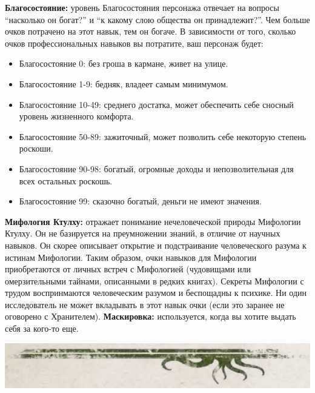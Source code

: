 \documentclass[letterpaper,twocolumn,openany, twoside, 11pt, usenames]{cocbook}
\begin{document}
\begin{fullcocpaperbox}{}{}
\begin{multicols}{3}
  \smallbreak
  \textbf{Благосостояние:} уровень Благосостояния персонажа отвечает на вопросы ``насколько он богат?'' и ``к какому слою общества он принадлежит?''. Чем больше очков потрачено на этот навык, тем он богаче. В зависимости от того, сколько очков профессиональных навыков вы потратите, ваш персонаж будет:
    \begin{itemize}[leftmargin=4mm]
      \item Благосостояние 0: без гроша в кармане, живет на улице.
      \item Благосостояние 1-9: бедняк, владеет самым минимумом.
      \item Благосостояние 10-49: среднего достатка, может обеспечить себе сносный уровень жизненного комфорта.
      \item Благосостояние 50-89: зажиточный, может позволить себе некоторую степень роскоши.
      \item Благосостояние 90-98: богатый, огромные доходы и непозволительная для всех остальных роскошь.
      \item Благосостояние 99: сказочно богатый, деньги не имеют значения.
    \end{itemize}
  \smallbreak
    \noindent {}
  \smallbreak
  \textbf{Мифология Ктулху:} отражает понимание нечеловеческой природы Мифологии Ктулху. Он не базируется на преумножении знаний, в отличие от научных навыков. Он скорее описывает открытие и подстраивание человеческого разума к истинам Мифологии. Таким образом, очки навыков для Мифологии приобретаются от личных встреч с Мифологией (чудовищами или омерзительными тайнами, описанными в редких книгах). Секреты Мифологии с трудом воспринмаются человеческим разумом и беспощадны к психике. Ни один исследователь не может вкладывать в этот навык очки (если это заранее не оговорено с Хранителем).
  \smallbreak
  \textbf{Маскировка:} используется, когда вы хотите выдать себя за кого-то еще.
  \end{multicols}
  \includegraphics[width=\linewidth]{img/bottom.png}
\end{fullcocpaperbox}
\end{document}
